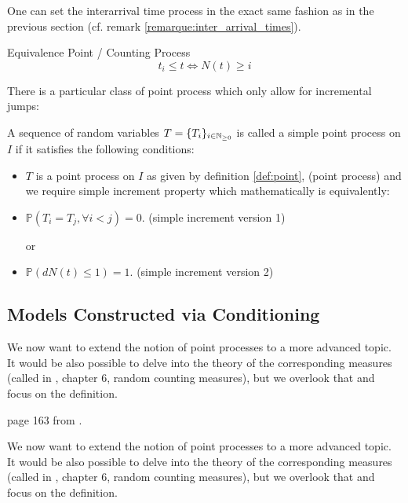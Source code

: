 \begin{remarque}
One can set the interarrival time process in the exact same fashion as in the previous section (cf. remark \ref{remarque:inter_arrival_times}).
\end{remarque}

\begin{theoreme}[label = thrm:point_counting]{Equivalence Point / Counting Process}
\begin{equation}
t_i \leq t  \iff N(t) \geq i 
\end{equation}
\end{theoreme}


There is a particular class of point process which only allow for incremental jumps:
\begin{definition}
A sequence of random variables $T = \{ T_i \}_{ i \in \mathbb{N}_{\geq 0}}$ is called a simple point process on $I$ if it satisfies the following conditions:
\begin{itemize}
\setlength{\itemindent}{3 cm}
\item $T$ is a point process on $I$ as given by definition \ref{def:point}, (point process)
and we require simple increment property which mathematically is equivalently:
\item $\mathbb P ( T_i = T_j, \forall i < j) = 0$. (simple increment version 1)

or

\item $\mathbb P ( dN(t) \leq 1) = 1$. (simple increment version 2)
\end{itemize}
\end{definition}


\subsection{Models Constructed via Conditioning}
We now want to extend the notion of point processes to a more advanced topic. It would be also possible to delve into the theory of the corresponding measures (called in \cite{daley}, chapter 6, random counting measures), but we overlook that and focus on the definition.


\begin{ajoutationV}{}{}
page 163 from \cite{daley}.


We now want to extend the notion of point processes to a more advanced topic. It would be also possible to delve into the theory of the corresponding measures (called in \cite{daley}, chapter 6, random counting measures), but we overlook that and focus on the definition.

\end{ajoutationV}


